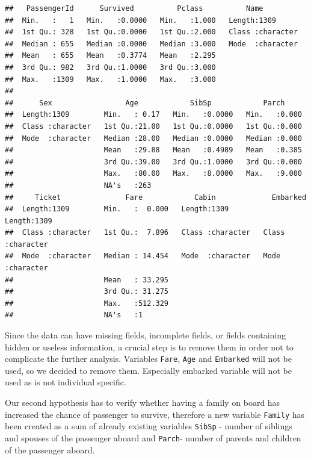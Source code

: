 \documentclass[
]{article}
\begin{document}
\begin{verbatim}
##   PassengerId      Survived          Pclass          Name          
##  Min.   :   1   Min.   :0.0000   Min.   :1.000   Length:1309       
##  1st Qu.: 328   1st Qu.:0.0000   1st Qu.:2.000   Class :character  
##  Median : 655   Median :0.0000   Median :3.000   Mode  :character  
##  Mean   : 655   Mean   :0.3774   Mean   :2.295                     
##  3rd Qu.: 982   3rd Qu.:1.0000   3rd Qu.:3.000                     
##  Max.   :1309   Max.   :1.0000   Max.   :3.000                     
##                                                                    
##      Sex                 Age            SibSp            Parch      
##  Length:1309        Min.   : 0.17   Min.   :0.0000   Min.   :0.000  
##  Class :character   1st Qu.:21.00   1st Qu.:0.0000   1st Qu.:0.000  
##  Mode  :character   Median :28.00   Median :0.0000   Median :0.000  
##                     Mean   :29.88   Mean   :0.4989   Mean   :0.385  
##                     3rd Qu.:39.00   3rd Qu.:1.0000   3rd Qu.:0.000  
##                     Max.   :80.00   Max.   :8.0000   Max.   :9.000  
##                     NA's   :263                                     
##     Ticket               Fare            Cabin             Embarked        
##  Length:1309        Min.   :  0.000   Length:1309        Length:1309       
##  Class :character   1st Qu.:  7.896   Class :character   Class :character  
##  Mode  :character   Median : 14.454   Mode  :character   Mode  :character  
##                     Mean   : 33.295                                        
##                     3rd Qu.: 31.275                                        
##                     Max.   :512.329                                        
##                     NA's   :1
\end{verbatim}

Since the data can have missing fields, incomplete fields, or fields
containing hidden or useless information, a crucial step is to remove
them in order not to complicate the further analysis. Variables
\texttt{Fare}, \texttt{Age} and \texttt{Embarked} will not be used, so
we decided to remove them. Especially embarked variable will not be used
as is not individual specific.

Our second hypothesis has to verify whether having a family on board has
increased the chance of passenger to survive, therefore a new variable
\texttt{Family} has been created as a sum of already existing variables
\texttt{SibSp} - number of siblings and spouses of the passenger aboard
and \texttt{Parch}- number of parents and children of the passenger
aboard.
\end{document}
